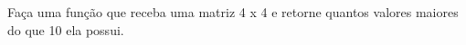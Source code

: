 
\question[10]

Faça uma função que receba uma matriz 4 x 4 e retorne quantos valores maiores do que 10 ela possui.

